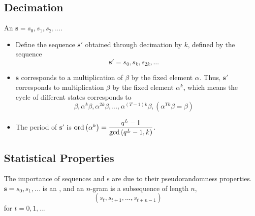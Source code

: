 







\subsection{Decimation}\label{subsec:Decimation}
An  $\mathbf{s} = s_{0}, s_{1}, s_{2}, \ldots$.
\begin{itemize}[noitemsep]
\item Define the sequence $\mathbf{s}'$ obtained through decimation by $k$, defined by the sequence
  \begin{equation*}
    \mathbf{s}' = s_{0}, s_{k}, s_{2k}, \ldots
  \end{equation*}
\item $\mathbf{s}$ corresponds to a multiplication of $\beta$ by the fixed element $\alpha$. Thus, $\mathbf{s}'$ corresponds to multiplication $\beta$ by the fixed element $\alpha^{k}$, which means the cycle of different states corresponds to
  \begin{equation*}
    \beta, \alpha^{k}\beta, \alpha^{2k}\beta, \ldots, \alpha^{(T-1)k}\beta, \left( \alpha^{Tk}\beta = \beta \right)
  \end{equation*}
\item The period of $\mathbf{s}'$ is $\operatorname{\operatorname{ord}} \left( \alpha^{k} \right) = \dfrac{q^{L}-1}{\gcd \left( q^{L}-1, k \right)}$.
\end{itemize}

\subsection{Statistical Properties}\label{subsec:LFSR_Statistical_Properties}
The importance of  sequences and s are due to their pseudorandomness properties.
$\mathbf{s} = s_{0}, s_{1}, \ldots$ is an , and an $n$-gram is a subsequence of length $n$,
\begin{equation*}
  \left( s_{t}, s_{t+1}, \ldots, s_{t+n-1} \right)
\end{equation*}
for $t=0, 1, \ldots$

